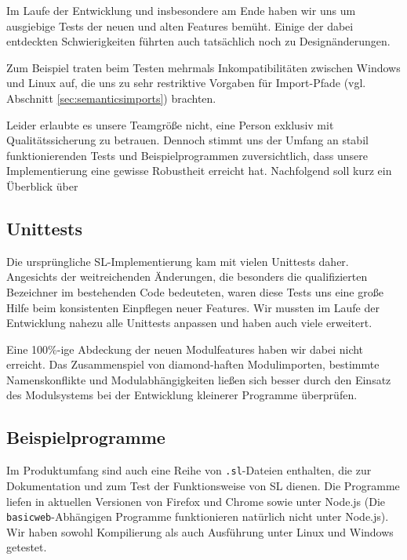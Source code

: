 \documentclass[runningheads]{llncs}
\begin{document}
Im Laufe der Entwicklung und insbesondere am Ende haben wir uns um ausgiebige
Tests der neuen und alten Features bemüht. Einige der dabei entdeckten
Schwierigkeiten führten auch tatsächlich noch zu Designänderungen.

Zum Beispiel traten beim Testen mehrmals Inkompatibilitäten zwischen Windows
und Linux auf, die uns zu sehr restriktive Vorgaben für Import-Pfade
(vgl. Abschnitt \ref{sec:semanticsimports}) brachten.

Leider erlaubte es unsere Teamgröße nicht, eine Person exklusiv mit
Qualitätssicherung zu betrauen. Dennoch stimmt uns der Umfang an stabil
funktionierenden Tests und Beispielprogrammen zuversichtlich, dass unsere
Implementierung eine gewisse Robustheit erreicht hat. Nachfolgend soll
kurz ein Überblick über 

\subsection{Unittests}

Die ursprüngliche SL-Implementierung kam mit vielen Unittests daher.
Angesichts der weitreichenden Änderungen, die besonders die qualifizierten
Bezeichner im bestehenden Code bedeuteten, waren diese Tests uns eine große
Hilfe beim konsistenten Einpflegen neuer Features. Wir mussten im Laufe der
Entwicklung nahezu alle Unittests anpassen und haben auch viele erweitert.

Eine 100\%-ige Abdeckung der neuen Modulfeatures haben wir dabei nicht erreicht.
Das Zusammenspiel von diamond-haften Modulimporten, bestimmte Namenskonflikte
und Modulabhängigkeiten ließen sich besser durch den Einsatz des Modulsystems
bei der Entwicklung kleinerer Programme überprüfen.

\subsection{Beispielprogramme}
\label{sec:sampleApps}

Im Produktumfang sind auch eine Reihe von \verb|.sl|-Dateien enthalten, die
zur Dokumentation und zum Test der Funktionsweise von SL dienen. Die Programme
liefen in aktuellen Versionen von Firefox und Chrome sowie unter Node.js
(Die \verb|basicweb|-Abhängigen Programme funktionieren natürlich nicht unter
Node.js). Wir haben sowohl Kompilierung als auch Ausführung unter Linux und
Windows getestet.
\end{document}
